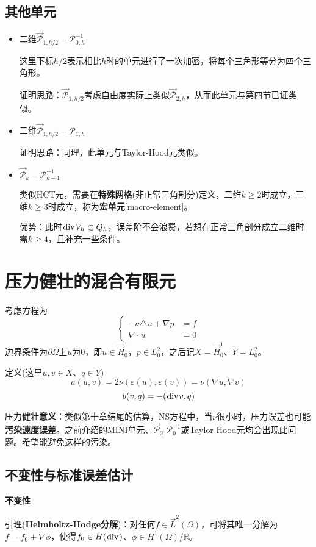 \documentclass[a4paper,UTF8,fontset=windows]{ctexart}
\newcommand*{\cp}{\mathcal{P}}
\renewcommand*{\div}{\hspace{0.07em}\mathrm{div}\hspace{0.07em}}
\begin{document}
\subsection{其他单元}
\begin{itemize}
    \item 二维$\vec{\cp}_{1,h/2}-\cp_{0,h}^{-1}$
    
    这里下标$h/2$表示相比$h$时的单元进行了一次加密，将每个三角形等分为四个三角形。

    证明思路：$\vec{\cp}_{1,h/2}$考虑自由度实际上类似$\vec{\cp}_{2,h}$，从而此单元与第四节已证类似。
    
    \item 二维$\vec{\cp}_{1,h/2}-\cp_{1,h}$
    
    证明思路：同理，此单元与Taylor-Hood元类似。

    \item $\vec{\cp}_k-\cp_{k-1}^{-1}$
    
    类似HCT元，需要在\textbf{特殊网格}(非正常三角剖分)定义，二维$k\ge2$时成立，三维$k\ge3$时成立，称为\textbf{宏单元}[macro-element]。

    优势：此时$\div V_h\subset Q_h$，误差阶不会浪费，若想在正常三角剖分成立二维时需$k\ge4$，且补充一些条件。
\end{itemize}

\section{压力健壮的混合有限元}
考虑方程为
$$\begin{cases}-\nu\triangle u+\nabla p&=f\\\nabla\cdot u&=0\end{cases}$$
边界条件为$\partial\Omega$上$u$为0，即$u\in\vec{H}_0^1$，$p\in L_0^2$，之后记$X=\vec{H}_0^1$、$Y=L_0^2$。

定义(这里$u,v\in X$、$q\in Y$)
$$a(u,v)=2\nu(\varepsilon(u),\varepsilon(v))=\nu(\nabla u,\nabla v)$$
$$b(v,q)=-(\div v,q)$$

压力健壮\textbf{意义}：类似第十章结尾的估算，NS方程中，当$\nu$很小时，压力误差也可能\textbf{污染速度误差}。之前介绍的MINI单元、$\vec{\cp}_2$-$\cp_0^{-1}$或Taylor-Hood元均会出现此问题。希望能避免这样的污染。

\subsection{不变性与标准误差估计}
\textbf{不变性}

引理(\textbf{Helmholtz-Hodge分解})：对任何$f\in\vec{L}^2(\Omega)$，可将其唯一分解为$f=f_0+\nabla\phi$，使得$f_0\in H(\div)$、$\phi\in H^1(\Omega)/\mathbb{R}$。
\end{document}
